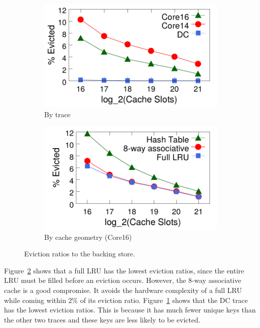 \begin{figure}[!t]
\centering
\begin{subfigure}[t]{0.48\columnwidth}
\raggedright
\includegraphics[width=\linewidth]{pq_eviction-rate-alltraces.pdf}
\vspace{-0.2in}
\caption{By trace}
\label{fig:eviction-traces}
\end{subfigure}
\begin{subfigure}[t]{0.48\columnwidth}
\raggedleft
\includegraphics[width=\linewidth]{pq_eviction-rate-geo-core16.pdf}
\vspace{-0.2in}
\caption{By cache geometry (Core16)}
\label{fig:eviction-geo}
\end{subfigure}
\vspace{-0.1in}
\caption{Eviction ratios to the backing store.}
\vspace{-0.25in}
\label{fig:eviction-ratios}
\end{figure}

Figure~\ref{fig:eviction-geo} shows that a full LRU has the lowest eviction
ratios, since the entire LRU must be filled before an eviction occurs. However,
the 8-way associative cache is a good compromise. It avoids the hardware
complexity of a full LRU while coming within 2\% of its eviction ratio.
Figure~\ref{fig:eviction-traces} shows that the DC trace has the lowest
eviction ratios.  This is because it has much fewer unique keys than the other
two traces and these keys are less likely to be evicted.

